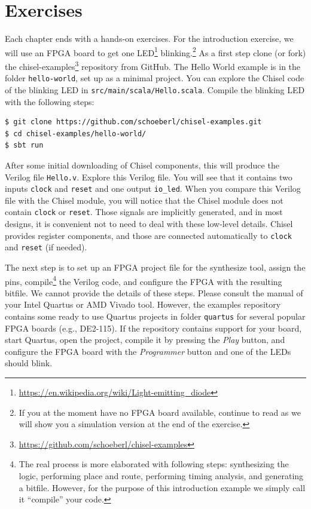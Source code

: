 \documentclass[%
    10pt,
    headinclude, footexclude,
    openright, %
    notitlepage,
    cleardoubleempty,
    headsepline,
    pointlessnumbers,
    bibtotoc, idxtotoc,
    ]{scrbook}
\newcommand{\code}[1]{{\small{\texttt{#1}}}}
\newcommand{\myref}[2]{\href{#1}{#2}}
\renewcommand{\myref}[2]{{#2}{\footnote{\url{#1}}}}
\begin{document}
\section{Exercises}

Each chapter ends with a hands-on exercises. For the introduction exercise, we will use an
FPGA board to get one \myref{https://en.wikipedia.org/wiki/Light-emitting_diode}{LED}
blinking.\footnote{If you at the moment have no FPGA board available, continue to read
as we will show you a simulation version at the end of the exercise.}
As a first step clone (or fork) the \myref{https://github.com/schoeberl/chisel-examples}{chisel-examples}
repository from GitHub.
The Hello World example is in the folder \code{hello-world}, set up as
a minimal project. You can explore the Chisel code of the blinking LED
in \code{src/main/scala/Hello.scala}.
Compile the blinking LED with the following steps:

\begin{verbatim}
$ git clone https://github.com/schoeberl/chisel-examples.git
$ cd chisel-examples/hello-world/
$ sbt run
\end{verbatim}

After some initial downloading of Chisel components, this will produce the Verilog file \code{Hello.v}.
Explore this Verilog file. You will see that it contains two inputs \code{clock} and \code{reset}
and one output \code{io\_led}. When you compare this Verilog file with the Chisel module,
you will notice that the Chisel module does not contain \code{clock} or \code{reset}.
Those signals are implicitly generated, and in most designs, it is convenient not to need to
deal with these low-level details. Chisel provides register components, and those
are connected automatically to \code{clock} and \code{reset} (if needed).

The next step is to set up an FPGA project file for the synthesize tool, assign the pins,
compile\footnote{The real process is more elaborated with following steps: synthesizing the logic,
performing place and route, performing timing analysis, and generating a bitfile.
However, for the purpose of this introduction example we simply call it ``compile''
your code.} the Verilog code, and configure the FPGA with the resulting bitfile.
We cannot provide the details of these steps. Please consult the manual of
your Intel Quartus or AMD Vivado tool.
However, the examples repository contains some ready to use Quartus
projects in folder \code{quartus} for several popular FPGA boards (e.g., DE2-115).
If the repository contains support for your board, start Quartus, open the project,
compile it by pressing the \emph{Play} button, and configure the FPGA board
with the \emph{Programmer} button and one of the LEDs should blink.
\end{document}
